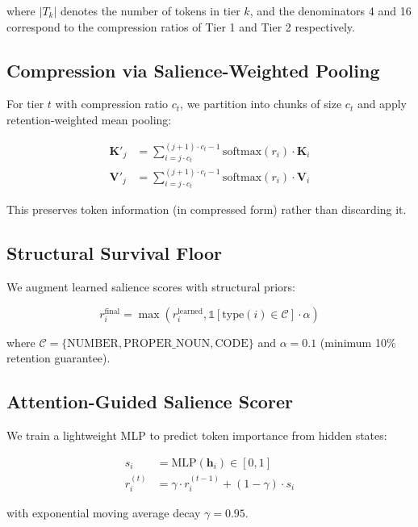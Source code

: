 \documentclass[11pt]{article}
\begin{document}
where $|T_k|$ denotes the number of tokens in tier $k$, and the denominators 4 and 16 correspond to the compression ratios of Tier 1 and Tier 2 respectively.

\subsection{Compression via Salience-Weighted Pooling}

For tier $t$ with compression ratio $c_t$, we partition into chunks of size $c_t$ and apply retention-weighted mean pooling:

\begin{align}
\mathbf{K}'_j &= \sum_{i=j \cdot c_t}^{(j+1) \cdot c_t - 1} \text{softmax}(r_i) \cdot \mathbf{K}_i \\
\mathbf{V}'_j &= \sum_{i=j \cdot c_t}^{(j+1) \cdot c_t - 1} \text{softmax}(r_i) \cdot \mathbf{V}_i
\end{align}

This preserves token information (in compressed form) rather than discarding it.

\subsection{Structural Survival Floor}

We augment learned salience scores with structural priors:

\begin{equation}
r_i^{\text{final}} = \max\left(r_i^{\text{learned}}, \mathbb{1}[\text{type}(i) \in \mathcal{C}] \cdot \alpha\right)
\end{equation}

where $\mathcal{C} = \{\text{NUMBER}, \text{PROPER\_NOUN}, \text{CODE}\}$ and $\alpha=0.1$ (minimum 10\% retention guarantee).

\subsection{Attention-Guided Salience Scorer}

We train a lightweight MLP to predict token importance from hidden states:

\begin{align}
s_i &= \text{MLP}(\mathbf{h}_i) \in [0,1] \\
r_i^{(t)} &= \gamma \cdot r_i^{(t-1)} + (1-\gamma) \cdot s_i
\end{align}

with exponential moving average decay $\gamma=0.95$.
\end{document}
